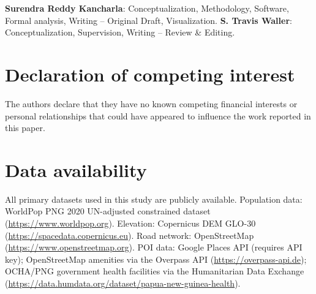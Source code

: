 \documentclass[review,3p,authoryear]{elsarticle}
\begin{document}
\textbf{Surendra Reddy Kancharla}: Conceptualization, Methodology, Software, Formal analysis, Writing -- Original Draft, Visualization. \textbf{S. Travis Waller}: Conceptualization, Supervision, Writing -- Review \& Editing.

\section*{Declaration of competing interest}

The authors declare that they have no known competing financial interests or personal relationships that could have appeared to influence the work reported in this paper.

\section*{Data availability}

All primary datasets used in this study are publicly available. Population data: WorldPop PNG 2020 UN-adjusted constrained dataset (\url{https://www.worldpop.org}). Elevation: Copernicus DEM GLO-30 (\url{https://spacedata.copernicus.eu}). Road network: OpenStreetMap (\url{https://www.openstreetmap.org}). POI data: Google Places API (requires API key); OpenStreetMap amenities via the Overpass API (\url{https://overpass-api.de}); OCHA/PNG government health facilities via the Humanitarian Data Exchange (\url{https://data.humdata.org/dataset/papua-new-guinea-health}). 



\end{document}
